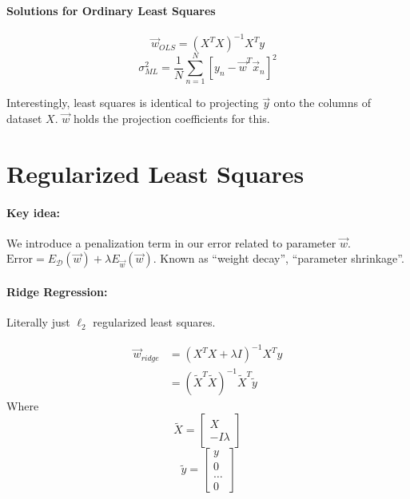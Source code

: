 \documentclass[a4paper,12pt]{report}
\begin{document}
\paragraph{Solutions for Ordinary Least Squares} 

\begin{equation}
\vec w_{OLS} = (X^T X)^{-1} X^T y
\end{equation}
\begin{equation}
\sigma^2_{ML} = \frac{1}{N} \sum_{n=1}^{N} [y_n - \vec w^T \vec x_n]^2
\end{equation}

Interestingly, least squares is identical to projecting $\vec y$ onto the columns of dataset $X$. $\vec w$ holds the projection coefficients for this. 


\section{Regularized Least Squares}

\paragraph{Key idea: } We introduce a penalization term in our error related to parameter $\vec w$. $\text{Error} = E_{\mathcal D}(\vec w) + \lambda E_{\vec w}(\vec w)$. Known as ``weight decay'', ``parameter shrinkage''. 

\paragraph{Ridge Regression: } Literally just $\ell_2$ regularized least squares. 

\begin{equation}
\begin{split}
\vec w_{ridge} &= (X^TX + \lambda I )^{-1} X^T y \\
&= (\tilde X^T\tilde X)^{-1} \tilde X^T \tilde y
\end{split}
\end{equation}
Where $$\tilde X = \begin{bmatrix} X\\-I\lambda \end{bmatrix}$$ $$\tilde y = \begin{bmatrix} y\\0\\\dots\\0 \end{bmatrix}$$
\end{document}
